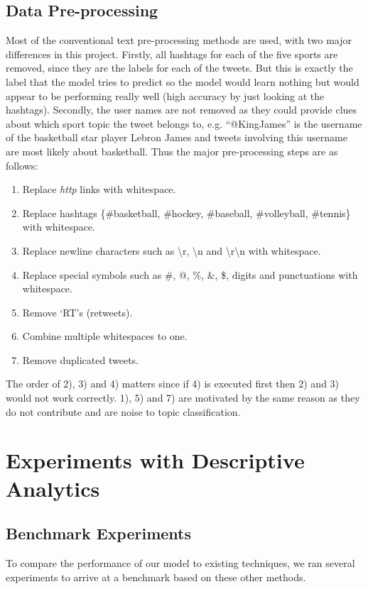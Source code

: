 \documentclass[journal, a4paper]{IEEEtran}
\begin{document}
\subsection{Data Pre-processing}
Most of the conventional text pre-processing methods are used, with two major differences in this project. Firstly, all hashtags for each of the five sports are removed, since they are the labels for each of the tweets. But this is exactly the label that the model tries to predict so the model would learn nothing but would appear to be performing really well (high accuracy by just looking at the hashtags). Secondly, the user names are not removed as they could provide clues about which sport topic the tweet belongs to, e.g. ``@KingJames'' is the username of the basketball star player Lebron James and tweets involving this username are most likely about basketball. Thus the major pre-processing steps are as follows:
\begin{enumerate}
\item Replace \textit{http} links with whitespace.
\item Replace hashtags \{\#basketball, \#hockey, \#baseball, \#volleyball, \#tennis\} with whitespace.
\item Replace newline characters such as \textbackslash r, \textbackslash n and \textbackslash r\textbackslash n with whitespace.
\item Replace special symbols such as \#, @, \%, \&, \$, digits and punctuations with whitespace.
\item Remove `RT's (retweets).
\item Combine multiple whitespaces to one.
\item Remove duplicated tweets.
\end{enumerate}

The order of 2), 3) and 4) matters since if 4) is executed first then 2) and 3) would not work correctly. 1), 5) and 7) are motivated by the same reason as they do not contribute and are noise to topic classification.
\section{Experiments with Descriptive Analytics}
\subsection{Benchmark Experiments}
To compare the performance of our model to existing techniques, we ran several experiments to arrive at a  benchmark based on these other methods.
\end{document}
